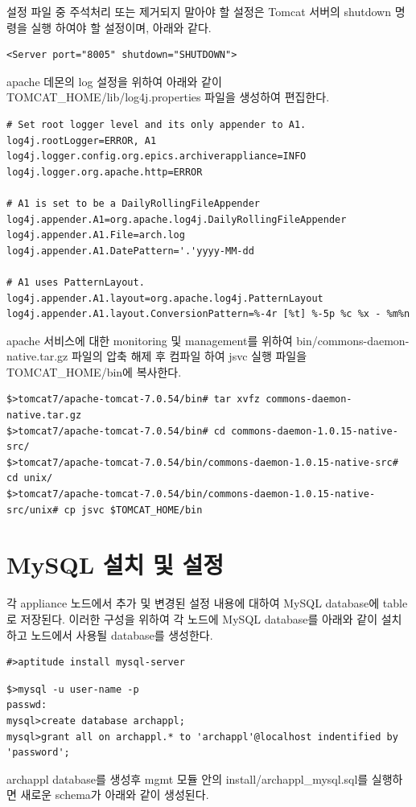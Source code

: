 \documentclass[11pt
  , a4paper
  , article
  , oneside
]{memoir}
\begin{document}
설정 파일 중 주석처리 또는 제거되지 말아야 할 설정은 Tomcat 서버의 shutdown 명령을 실행 하여야 할 설정이며,
아래와 같다.
\begin{lstlisting}[style=termstyle]
<Server port="8005" shutdown="SHUTDOWN">
\end{lstlisting}

apache 데몬의 log 설정을 위하여 아래와 같이 TOMCAT\_HOME/lib/log4j.properties 파일을 생성하여 편집한다. 
\begin{lstlisting}[style=termstyle]
# Set root logger level and its only appender to A1.
log4j.rootLogger=ERROR, A1
log4j.logger.config.org.epics.archiverappliance=INFO
log4j.logger.org.apache.http=ERROR

# A1 is set to be a DailyRollingFileAppender
log4j.appender.A1=org.apache.log4j.DailyRollingFileAppender
log4j.appender.A1.File=arch.log
log4j.appender.A1.DatePattern='.'yyyy-MM-dd

# A1 uses PatternLayout.
log4j.appender.A1.layout=org.apache.log4j.PatternLayout
log4j.appender.A1.layout.ConversionPattern=%-4r [%t] %-5p %c %x - %m%n
\end{lstlisting}

apache 서비스에 대한 monitoring 및 management를 위하여 bin/commons-daemon-native.tar.gz 파일의 압축 해제 후 컴파일 하여 jsvc 실행 파일을 TOMCAT\_HOME/bin에 복사한다.

\begin{lstlisting}[style=termstyle]
$>tomcat7/apache-tomcat-7.0.54/bin# tar xvfz commons-daemon-native.tar.gz 
$>tomcat7/apache-tomcat-7.0.54/bin# cd commons-daemon-1.0.15-native-src/
$>tomcat7/apache-tomcat-7.0.54/bin/commons-daemon-1.0.15-native-src# cd unix/
$>tomcat7/apache-tomcat-7.0.54/bin/commons-daemon-1.0.15-native-src/unix# cp jsvc $TOMCAT_HOME/bin
\end{lstlisting}

\section{MySQL 설치 및 설정}
각 appliance 노드에서 추가 및 변경된 설정 내용에 대하여 MySQL database에 table로 저장된다. 이러한 구성을 위하여 각 노드에 MySQL database를 아래와 같이 설치하고 노드에서 사용될 database를 생성한다.
\begin{lstlisting}[style=termstyle]
#>aptitude install mysql-server 
\end{lstlisting}

\begin{lstlisting}[style=termstyle]
$>mysql -u user-name -p
passwd:
mysql>create database archappl;
mysql>grant all on archappl.* to 'archappl'@localhost indentified by 'password';
\end{lstlisting}
archappl database를 생성후 mgmt 모듈 안의 install/archappl\_mysql.sql를 실행하면 새로운 schema가 아래와 같이 생성된다.
\end{document}
